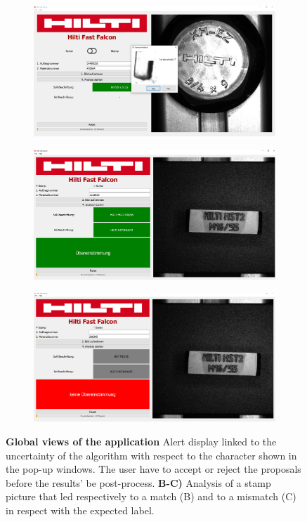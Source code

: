 \documentclass[12pt, french, a4paper]{article} %
\begin{document}
\begin{figure}[H]
 \centering
 \begin{subfigure}{0.6\textwidth}
  \includegraphics[width=\linewidth]{figure/alert.png}
  \subcaption{}
  \label{app_view_alt}
 \end{subfigure}
  \begin{subfigure}{0.6\textwidth}
  \includegraphics[width=\linewidth]{figure/SATMP_success.PNG}
  \subcaption{}
  \label{app_view_stamp_sucess}
 \end{subfigure}
 \begin{subfigure}{0.6\textwidth}
  \includegraphics[width=\linewidth]{figure/SATMP_failure.PNG}
  \subcaption{}
  \label{app_view_stamp_echec}
 \end{subfigure}
 \caption{\textbf{Global views of the application} Alert display linked to the uncertainty of the algorithm with respect to the character shown in the pop-up windows. The user have to accept or reject the proposals before the results' be post-process. \textbf{B-C)} Analysis of a stamp picture that led respectively to a match (B) and to a mismatch (C) in respect with the expected label.}
 \label{APP_SUP}
\end{figure}%
\end{document}
